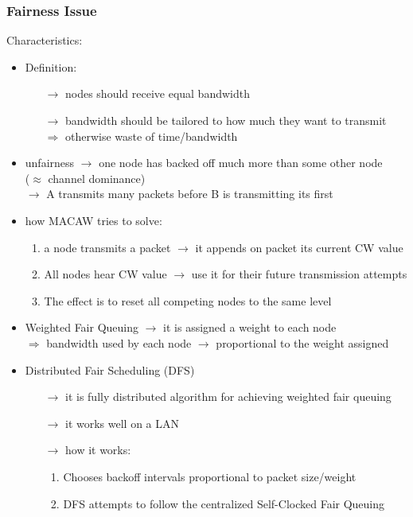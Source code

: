 \subsubsection{Fairness Issue}
Characteristics:
\begin{itemize}
    \item Definition:
    \begin{itemize}
        \item[$\rightarrow$] nodes should receive equal bandwidth
        \item[$\rightarrow$] bandwidth should be tailored to how much they want to transmit\\
        $\Rightarrow$ otherwise waste of time/bandwidth
    \end{itemize}
    \item unfairness $\rightarrow$ one node has backed
    off much more than some other node\\($\approx$ channel dominance)\\
    $\rightarrow$ A transmits many packets before B is transmitting its first
    \item how MACAW tries to solve:
    \begin{enumerate}
        \item a node transmits a packet $\rightarrow$ it appends on packet its current
        CW value
        \item All nodes hear CW value $\rightarrow$ use it for their future
        transmission attempts
        \item The effect is to reset all competing nodes to the same level
    \end{enumerate}
    \item Weighted Fair Queuing $\rightarrow$ it is assigned a weight to each node\\
    $\Rightarrow$ bandwidth used by each node $\rightarrow$ proportional to the weight
    assigned
    \newpage
    \item Distributed Fair Scheduling (DFS)
    \begin{itemize}
        \item[$\rightarrow$] it is fully distributed algorithm for achieving weighted
        fair queuing
        \item[$\rightarrow$] it works well on a LAN
        \item[$\rightarrow$] how it works:
        \begin{enumerate}
            \item Chooses backoff intervals proportional to
            packet size/weight
            \item DFS attempts to follow the centralized Self-Clocked
            Fair Queuing
        \end{enumerate}
    \end{itemize}
\end{itemize}
